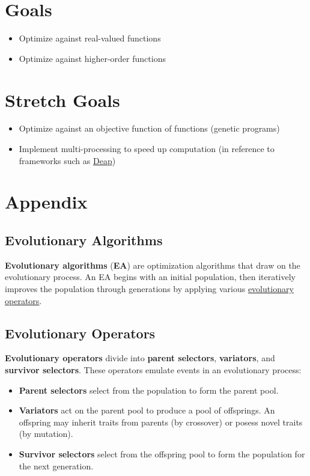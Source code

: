 \documentclass{article}
\begin{document}
\section{Goals}
\begin{itemize}
    \item Optimize against real-valued functions
    \item Optimize against higher-order functions
\end{itemize}

\section{Stretch Goals}

\begin{itemize}
    \item Optimize against an objective function of functions (genetic programs)
    \item Implement multi-processing to speed up computation (in reference to frameworks such as \href{https://deap.readthedocs.io/en/master/}{Deap})
\end{itemize}
\section{Appendix}

\subsection{Evolutionary Algorithms}
\label{sec:evalg}
\textbf{Evolutionary algorithms} (\textbf{EA}) are optimization algorithms that draw on the evolutionary process. An EA begins with an initial population, then iteratively improves the population through generations by applying various \hyperref[sec:evop]{evolutionary operators}.

\subsection{Evolutionary Operators}
\label{sec:evop}
\textbf{Evolutionary operators} divide into \textbf{parent selectors}, \textbf{variators}, and \textbf{survivor selectors}. These operators emulate events in an evolutionary process:

\begin{itemize}
    \item \textbf{Parent selectors} select from the population to form the parent pool.
    \item \textbf{Variators} act on the parent pool to produce a pool of offsprings. An offspring may inherit traits from parents (by crossover) or posess novel traits (by mutation).
    \item \textbf{Survivor selectors} select from the offspring pool to form the population for the next generation.
\end{itemize}
\end{document}
